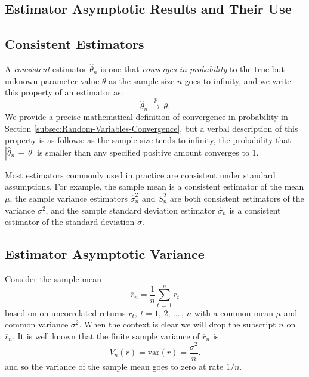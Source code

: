 \documentclass[graybox,envcountchap,sectrefs]{svmono}\usepackage[]{graphicx}\usepackage[]{xcolor}
\begin{document}
\begin{appendices}
\section{Estimator Asymptotic Results and Their Use}

\subsection{Consistent Estimators\label{subsec: estConsistent}}

A \emph{consistent} estimator $\hat{\theta}_{n}$ is one that \emph{converges
in probability} to the true but unknown parameter value $\theta$
as the sample size $n$ goes to infinity, and we write this property
of an estimator as:
\begin{equation}
\hat{\theta}_{n}\,\stackrel{p}{\rightarrow}\,\theta.\label{eq: convInProb}
\end{equation}
We provide a precise mathematical definition of convergence in probability
in Section \ref{subsec:Random-Variables-Convergence}, but a verbal
description of this property is as follows: as the sample size tends
to infinity, the probability that $\left|\hat{\theta}_{n}\,-\,\theta\right|$
is smaller than any specified positive amount converges to 1.

Most estimators commonly used in practice are consistent under standard
assumptions. For example, the sample mean is a consistent estimator
of the mean $\mu$, the sample variance estimators $\hat{\sigma}_{n}^{2}$
and $S_{n}^{2}$ are both consistent estimators of the variance $\sigma^{2}$,
and the sample standard deviation estimator $\hat{\sigma}_{n}$ is
a consistent estimator of the standard deviation $\sigma$.

\subsection{Estimator Asymptotic Variance\label{subsec: estAsympVariance}}

Consider the sample mean
\[
\overline{r}_{n}=\frac{1}{n}\sum_{t\,=\,1}^{n}r_{t}
\]
based on on uncorrelated returns $r_{t},\:t=1,\,2,\,\ldots\,,\,n$
with a common mean $\mu$ and common variance $\sigma^{2}$. When
the context is clear we will drop the subscript $n$ on $\overline{r}_{n}$.
It is well known that the finite sample variance of $\overline{r}_{n}$
is
\[
V_{n}\left(\overline{r}\right)=\mathrm{var}(\overline{r})=\frac{\sigma^{2}}{n}.
\]
and so the variance of the sample mean goes to zero at rate $1/n$.


\end{appendices}
\end{document}
